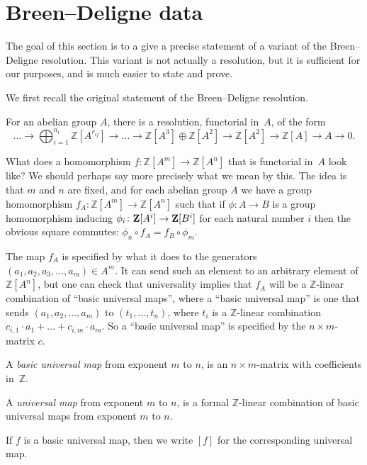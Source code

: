 \section{Breen--Deligne data}

The goal of this section is to a give a precise statement of
a variant of the Breen--Deligne resolution.
This variant is not actually a resolution,
but it is sufficient for our purposes,
and is much easier to state and prove.

We first recall the original statement of the Breen--Deligne resolution.
\begin{theoremx}
  \label{BD_orig}
  For an abelian group $A$, there is a resolution, functorial in~$A$, of the form
  \[
    \ldots \to \bigoplus_{i=1}^{n_i} \mathbb Z[A^{r_{ij}}] \to \ldots
    \to \mathbb Z[A^3] \oplus \mathbb Z[A^2] \to \mathbb Z[A^2] \to \mathbb Z[A] \to A \to 0.
  \]
\end{theoremx}

What does a homomorphism $f \colon \mathbb Z[A^m] \to \mathbb Z[A^n]$
that is functorial in~$A$ look like?
We should perhaps say more precisely what we mean by this.
The idea is that $m$ and $n$ are fixed,
and for each abelian group $A$ we have a group homomorphism
$f_A\colon \mathbb Z[A^m] \to \mathbb Z[A^n]$ 
such that if $\phi \colon A\to B$ is a group homomorphism
inducing $\phi_i \colon\mathbf{Z}[A^i]\to\mathbf{Z}[B^i]$ for each natural number $i$
then the obvious square commutes: $\phi_n \circ f_A = f_B \circ \phi_m$.

The map $f_A$ is specified by what it does to the generators
$(a_1, a_2, a_3, \dots, a_m)\in A^m$.
It can send such an element to an arbitrary element of $\mathbb Z[A^n]$,
but one can check that universality implies that $f_A$
will be a $\mathbb Z$-linear combination of ``basic universal maps'',
where a ``basic universal map'' is one that sends $(a_1, a_2, \dots, a_m)$ to $(t_1, \dots, t_n)$,
where $t_i$ is a $\mathbb Z$-linear combination $c_{i,1} \cdot a_1 + \dots + c_{i,m} \cdot a_m$.
So a ``basic universal map'' is specified by the $n \times m$-matrix $c$.

\begin{definition}
  \label{basic_universal_map}
  \leanok
  A \emph{basic universal map} from exponent $m$ to $n$,
  is an $n \times m$-matrix with coefficients in~$\mathbb Z$.
\end{definition}

\begin{definition}
  \label{universal_map}
  \leanok
  A \emph{universal map} from exponent $m$ to $n$,
  is a formal $\mathbb Z$-linear combination
  of basic universal maps from exponent $m$ to $n$.

  If $f$ is a basic universal map,
  then we write $[f]$ for the corresponding universal map.
\end{definition}

